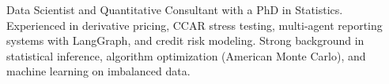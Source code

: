 
\begin{cvparagraph}
{
    Data Scientist and Quantitative Consultant with a PhD in Statistics. 
    Experienced in derivative pricing, CCAR stress testing, 
    multi-agent reporting systems with LangGraph, and credit risk modeling. 
    Strong background in statistical inference, algorithm optimization 
    (American Monte Carlo), and machine learning on imbalanced data. 
}
\end{cvparagraph}

